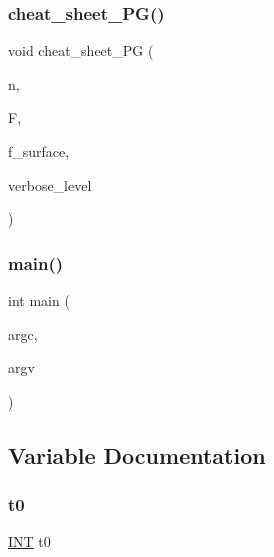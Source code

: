 \subsubsection{\texorpdfstring{cheat\+\_\+sheet\+\_\+\+P\+G()}{cheat\_sheet\_PG()}}
{\footnotesize\ttfamily void cheat\+\_\+sheet\+\_\+\+PG (\begin{DoxyParamCaption}\item[{\mbox{\hyperlink{galois_8h_a09fddde158a3a20bd2dcadb609de11dc}{I\+NT}}}]{n,  }\item[{\mbox{\hyperlink{classfinite__field}{finite\+\_\+field}} $\ast$}]{F,  }\item[{\mbox{\hyperlink{galois_8h_a09fddde158a3a20bd2dcadb609de11dc}{I\+NT}}}]{f\+\_\+surface,  }\item[{\mbox{\hyperlink{galois_8h_a09fddde158a3a20bd2dcadb609de11dc}{I\+NT}}}]{verbose\+\_\+level }\end{DoxyParamCaption})}

\mbox{\label{cheat__sheet___p_g_8_c_a3c04138a5bfe5d72780bb7e82a18e627}} 
\subsubsection{\texorpdfstring{main()}{main()}}
{\footnotesize\ttfamily int main (\begin{DoxyParamCaption}\item[{int}]{argc,  }\item[{char $\ast$$\ast$}]{argv }\end{DoxyParamCaption})}



\subsection{Variable Documentation}
\mbox{\label{cheat__sheet___p_g_8_c_a4268f4fe222ffb119218a0199f5e1904}} 
\subsubsection{\texorpdfstring{t0}{t0}}
{\footnotesize\ttfamily \mbox{\hyperlink{galois_8h_a09fddde158a3a20bd2dcadb609de11dc}{I\+NT}} t0}

